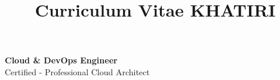 \documentclass[a4paper,skipsamekey,10pt,british]{curve}
\title{Curriculum Vitae KHATIRI}
\begin{document}
\makeheaders[c]
\hfill {}
\par \hfill	{}  

\begin{center}
\vspace{-1.6cm}
  {\LARGE\bfseries\sffamily Cloud \& DevOps Engineer}\\
  {\sffamily Certified - Professional Cloud Architect}
\end{center}


%

\begin{minipage}[c]{0.4\linewidth}
\end{minipage} \hfill
\begin{minipage}[c]{0.5\linewidth}
\end{minipage} 
\end{document}
